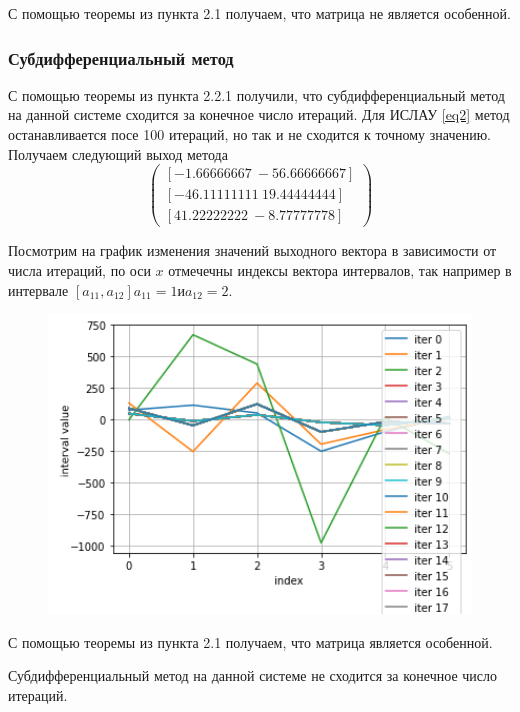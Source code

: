 \documentclass[../body.tex]{subfiles}
\begin{document}
 С помощью теоремы из пункта 2.1 получаем, что матрица не является особенной.
    
    \subsubsection{Субдифференциальный метод}
    С помощью теоремы из пункта 2.2.1 получили, что субдифференциальный метод на данной системе сходится за конечное число итераций.
     Для ИСЛАУ \ref{eq2} метод останавливается посе 100 итераций, но так и не сходится к точному значению. Получаем следующий выход метода
       \begin{equation*}
        \begin{pmatrix}
 [ -1.66666667 \ -56.66666667]\\
 [-46.11111111 \  19.44444444]\\
 [ 41.22222222 \  -8.77777778]
        \end{pmatrix}
    \end{equation*}
    
 

Посмотрим на график изменения значений выходного вектора в зависимости от числа итераций, по оси $x$ отмечечны индексы вектора интервалов, так например в интервале $[a_{11},a_{12}] a_{11} = 1 и a_{12} = 2$. 
    \begin{figure}[H]
    \centering
    \includegraphics[width=12cm]{3.png}
    \label{fig:1s}
\end{figure}
 
    С помощью теоремы из пункта 2.1 получаем, что матрица является особенной.
    
    Субдифференциальный метод на данной системе не сходится за конечное число итераций.
    
\end{document}
